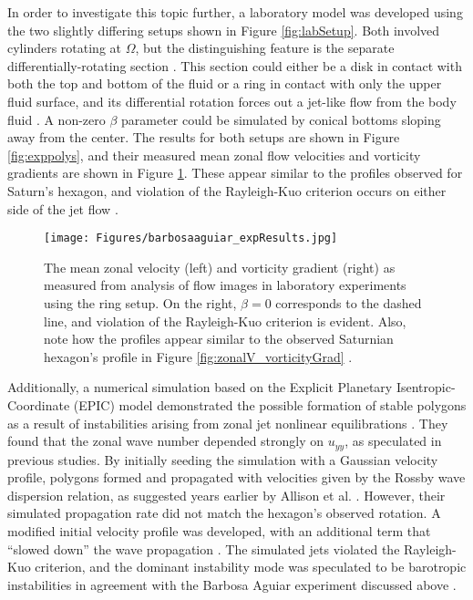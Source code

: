 \documentclass[preprint]{revtex4-1} %
\begin{document}
In order to investigate this topic further, a laboratory model was
developed using the two slightly differing setups shown in Figure
\ref{fig:labSetup}. 
Both involved cylinders 
rotating at $\Omega$, but the distinguishing
feature is the separate differentially-rotating section
\cite{BarbosaAguiar2010}.  This section could either be a disk in
contact with both the top and bottom of the fluid or a
ring in contact with only the upper fluid surface, and its
differential rotation forces out a jet-like flow from 
the body fluid \cite{BarbosaAguiar2010}.  A non-zero $\beta$ parameter
could be simulated by conical bottoms sloping away from the center.  The
results for both setups  
are shown in Figure \ref{fig:exppolys}, and their measured mean zonal
flow velocities and vorticity gradients are shown in Figure
\ref{fig:labFlowVorticity}.  These appear similar to the profiles
observed for Saturn's hexagon, and violation of the Rayleigh-Kuo
criterion occurs on either side of the jet flow \cite{BarbosaAguiar2010}.

\begin{figure}
  \centering
  \texttt{[image: Figures/barbosaaguiar\_expResults.jpg]}
  \caption{The mean zonal velocity (left) and vorticity gradient
    (right) as measured from analysis of flow images in laboratory
    experiments using the ring setup.  On the right, $\beta=0$
    corresponds to the dashed line, and violation of the Rayleigh-Kuo
    criterion  is evident.  Also, note how the profiles appear
    similar to the observed Saturnian hexagon's profile in Figure
    \ref{fig:zonalV_vorticityGrad} \cite[fig~6]{BarbosaAguiar2010}.} 
  \label{fig:labFlowVorticity}
\end{figure}

Additionally, a numerical simulation based on the Explicit Planetary
Isentropic-Coordinate (EPIC) model demonstrated the possible formation
of stable polygons as a result of instabilities arising from
zonal jet nonlinear equilibrations \cite{MoralesJuberias2011}.  They
found that the zonal wave number depended strongly on $u_{yy}$, as
speculated in previous studies.  By initially seeding the simulation with
a Gaussian velocity profile, polygons formed and propagated with
velocities given by the Rossby wave dispersion relation, as suggested
years earlier by Allison 
et al. \cite{Allison1990, MoralesJuberias2011}.  However, their
simulated propagation rate did not match the hexagon's observed
rotation.  A modified 
initial velocity profile was developed, with an additional term that
``slowed down'' the wave propagation \cite{MoralesJuberias2011}.  The
simulated jets violated the Rayleigh-Kuo criterion, and the dominant
instability mode was speculated to be barotropic instabilities in
agreement with the Barbosa Aguiar experiment discussed above
\cite{MoralesJuberias2011}.
\end{document}
